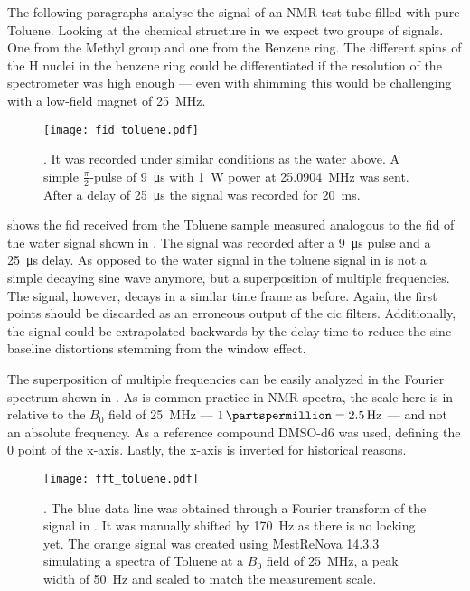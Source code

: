 The following paragraphs analyse the signal of an NMR test tube filled with pure Toluene. Looking at the chemical structure in  we expect two groups of signals. One from the  Methyl group and one from the Benzene ring. The different spins of the H nuclei in the benzene ring could be differentiated if the resolution of the spectrometer was high enough --- even with shimming this would be challenging with a low-field magnet of \qty{25}{\mega\hertz}.

\begin{figure}[h!bt]
    \centering
    \texttt{[image: fid\_toluene.pdf]}
    \caption{. It was recorded under similar conditions as the water above. A simple \(\frac{\pi}{2}\)-pulse of \qty{9}{\micro\second} with \qty{1}{\watt} power at \qty{25.0904}{\mega\hertz} was sent. After a delay of \qty{25}{\micro\second} the signal was recorded for \qty{20}{\milli\second}.}
\end{figure}

 shows the \acrshort{fid} received from the Toluene sample measured analogous to the \acrshort{fid} of the water signal shown in . The signal was recorded after a \qty{9}{\micro\second} pulse and a \qty{25}{\micro\second} delay. As opposed to the water signal in  the toluene signal in  is not a simple decaying sine wave anymore, but a superposition of multiple frequencies. The signal, however, decays in a similar time frame as before. Again, the first points should be discarded as an erroneous output of the \acrshort{cic} filters. Additionally, the signal could be extrapolated backwards by the delay time to reduce the sinc baseline distortions stemming from the window effect.

The superposition of multiple frequencies can be easily analyzed in the Fourier spectrum shown in . As is common practice in NMR spectra, the scale here is in \unit{\partspermillion} relative to the \(B_0\) field of \qty{25}{\mega\hertz} --- \(\qty{1}{\partspermillion} = \qty{2.5}{\hertz}\) --- and not an absolute frequency. As a reference compound DMSO-d6 was used, defining the \qty{0}{\partspermillion} point of the x-axis. Lastly, the x-axis is inverted for historical reasons.

\begin{figure}[h!bt]
    \centering
    \texttt{[image: fft\_toluene.pdf]}
    \caption{. The blue data line was obtained through a Fourier transform of the signal in . It was manually shifted by \qty{170}{\hertz} as there is no locking yet. The orange signal was created using MestReNova 14.3.3 simulating a spectra of Toluene at a $B_0$ field of \qty{25}{\mega\hertz}, a peak width of \qty{50}{\hertz} and scaled to match the measurement scale.}
\end{figure}

